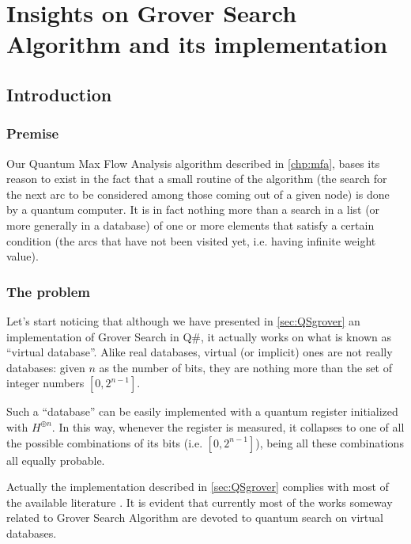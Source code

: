 
\chapter{Insights on Grover Search Algorithm and its implementation}
\label{chp:grover}

\section{Introduction}

\subsection{Premise}

Our Quantum Max Flow Analysis algorithm described in \cref{chp:mfa}, bases its reason to exist in the fact that a small routine of the algorithm (the search for the next arc to be considered among those coming out of a given node) is done by a quantum computer. It is in fact nothing more than a search in a list (or more generally in a database) of one or more elements that satisfy a certain condition (the arcs that have not been visited yet, i.e. having infinite weight value).

\subsection{The problem}

Let's start noticing that although we have presented in \cref{sec:QSgrover} an implementation of Grover Search in Q\#, it actually works on what is known as ``virtual database''. Alike real databases, virtual (or implicit) ones are not really databases: given $n$ as the number of bits, they are nothing more than the set of integer numbers $\left[0, 2^{n-1}\right]$.

Such a ``database'' can be easily implemented with a quantum register initialized with $H^{\oplus n}$. In this way, whenever the register is measured, it collapses to one of all the possible combinations of its bits (i.e. $\left[0, 2^{n-1}\right]$), being all these combinations all equally probable.

\bigskip

Actually the implementation described in \cref{sec:QSgrover} complies with most of the available literature \cite{Grover:1996:FQM:237814.237866, lavor2003grover}. It is evident that currently most of the works someway related to Grover Search Algorithm are devoted to quantum search on virtual databases. \cite{Broda2016}

